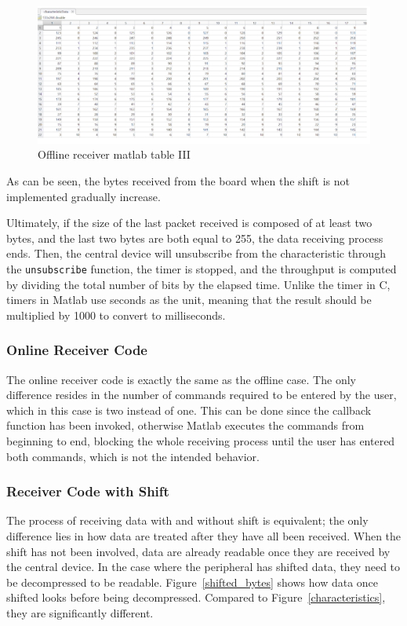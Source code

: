 \documentclass{Configuration_Files/PoliMi3i_thesis}
\begin{document}
\begin{figure}[H]
    \centering
    \includegraphics[scale=0.6]{Board Windows PC/6.png}
    \caption{Offline receiver matlab table III}
    \label{Boardwindows_6}
\end{figure}

As can be seen, the bytes received from the board when the shift is not implemented gradually increase.

Ultimately, if the size of the last packet received is composed of at least two bytes, and the last two bytes are both equal to 255, the data receiving process ends. Then, the central device will unsubscribe from the characteristic through the \texttt{unsubscribe} function, the timer is stopped, and the throughput is computed by dividing the total number of bits by the elapsed time. Unlike the timer in C, timers in Matlab use seconds as the unit, meaning that the result should be multiplied by 1000 to convert to milliseconds.

\subsubsection{Online Receiver Code}

The online receiver code is exactly the same as the offline case. The only difference resides in the number of commands required to be entered by the user, which in this case is two instead of one. This can be done since the callback function has been invoked, otherwise Matlab executes the commands from beginning to end, blocking the whole receiving process until the user has entered both commands, which is not the intended behavior.

\subsubsection{Receiver Code with Shift}

The process of receiving data with and without shift is equivalent; the only difference lies in how data are treated after they have all been received. When the shift has not been involved, data are already readable once they are received by the central device. In the case where the peripheral has shifted data, they need to be decompressed to be readable. Figure~\ref{shifted_bytes} shows how data once shifted looks before being decompressed. Compared to Figure~\ref{characteristics}, they are significantly different.
\end{document}
